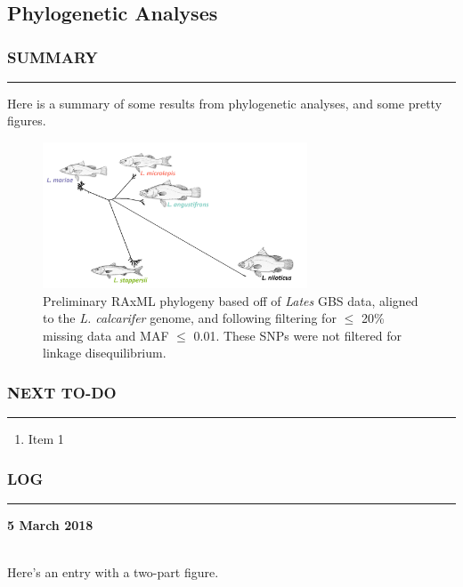 \clearpage
\chapter{}
\section{Phylogenetic Analyses}
\subsection*{SUMMARY}
\hrule
Here is a summary of some results from phylogenetic analyses, and some pretty figures.

\begin{figure}[ht]
\centering
\includegraphics[width=0.7\textwidth]
{figures/lates_phylogeny_020218.png}\caption{\label{fig:raxml-phylogeny} Preliminary RAxML phylogeny based off of \textit{Lates} GBS data, aligned to the \textit{L. calcarifer} genome, and following filtering for $\leq$ 20\% missing data and MAF $\leq$ 0.01. These SNPs were not filtered for linkage disequilibrium.}
\end{figure}

\subsection*{NEXT TO-DO}
\hrule

\begin{enumerate}
\item Item 1
\end{enumerate}

\subsection*{LOG}
\hrule
\hrulefill
\begin{large}\textbf{5 March 2018}\end{large} \\
Here's an entry with a two-part figure.

